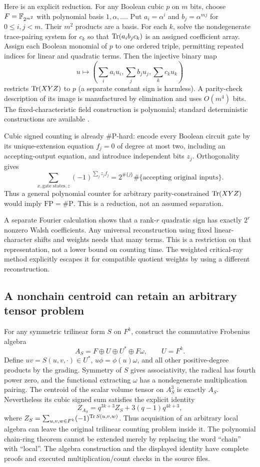 Here is an explicit reduction. For any Boolean cubic $p$ on $m$ bits,
choose $F=\mathbb F_{2^{m^2}}$ with polynomial basis $1,\alpha,\ldots$.
Put $a_i=\alpha^i$ and $b_j=\alpha^{mj}$ for $0\le i,j<m$.
Their $m^2$ products are a basis. For each $k$, solve the nondegenerate
trace-pairing system for $c_k$ so that
$\operatorname{Tr}(a_i b_j c_k)$ is an assigned coefficient array. Assign each Boolean
monomial of $p$ to one ordered triple, permitting repeated indices for
linear and quadratic terms. Then the injective binary map
\[
 u\longmapsto\left(\sum_i a_i u_i,\sum_j b_j u_j,\sum_k c_k u_k\right)
\]
restricts $\operatorname{Tr}(XYZ)$ to $p$ (a separate constant sign is harmless).
A parity-check description of its image is manufactured by elimination
and uses $O(m^4)$ bits. The fixed-characteristic field construction is
polynomial; standard deterministic constructions are available \cite{shoup}.

Cubic signed counting is already \#P-hard: encode every Boolean circuit
gate by its unique-extension equation $f_j=0$ of degree at most two,
including an accepting-output equation, and introduce independent bits
$z_j$. Orthogonality gives
\[
 \sum_{x,\text{gate states},z}(-1)^{\sum_j z_j f_j}
   =2^{\#\{j\}}\#\{\text{accepting original inputs}\}.
\]
Thus a general polynomial counter for arbitrary parity-constrained
$\operatorname{Tr}(XYZ)$ would imply $\mathrm{FP}=\#\mathrm P$.
This is a reduction, not an assumed separation.

A separate Fourier calculation shows that a rank-$r$ quadratic sign has
exactly $2^r$ nonzero Walsh coefficients. Any universal reconstruction
using fixed linear-character shifts and weights needs that many terms.
This is a restriction on that representation, not a lower bound on
counting time. The weighted critical-ray method explicitly escapes it
for compatible quotient weights by using a different reconstruction.

\subsection{A nonchain centroid can retain an arbitrary tensor problem}
For any symmetric trilinear form $S$ on $F^k$, construct the commutative
Frobenius algebra
\[
 A_S=F\oplus U\oplus U^*\oplus F\omega,\qquad U=F^k.
\]
Define $uv=S(u,v,\cdot)\in U^*$, $u\phi=\phi(u)\omega$, and all other
positive-degree products by the grading. Symmetry of $S$ gives
associativity, the radical has fourth power zero, and the functional
extracting $\omega$ has a nondegenerate multiplication pairing.
The centroid of the scalar volume tensor on $A_S^3$ is exactly $A_S$.
Nevertheless its cubic signed sum satisfies the explicit identity
\[
 Z_{A_S}=q^{3k+3} Z_S+3(q-1)q^{4k+3},
\]
where $Z_S=\sum_{u,v,w\in F^k}(-1)^{\operatorname{Tr} S(u,v,w)}$.
Thus acquisition of an arbitrary local algebra can leave the original
trilinear counting problem inside it. The polynomial chain-ring theorem
cannot be extended merely by replacing the word ``chain'' with ``local''.
The algebra construction and the displayed identity have complete
proofs and executed multiplication/count checks in the source files.

